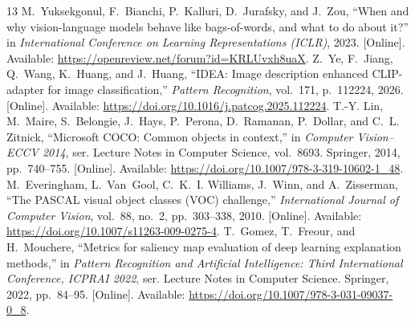 \begin{thebibliography}{13}
M.~Yuksekgonul, F.~Bianchi, P.~Kalluri, D.~Jurafsky, and J.~Zou, ``When and why
vision-language models behave like bags-of-words, and what to do about it?'' in
\emph{International Conference on Learning Representations (ICLR)}, 2023.
[Online]. Available: \url{https://openreview.net/forum?id=KRLUvxh8uaX}.
Z.~Ye, F.~Jiang, Q.~Wang, K.~Huang, and J.~Huang, ``{IDEA}: Image description
enhanced {CLIP}-adapter for image classification,'' \emph{Pattern Recognition},
vol.~171, p.~112224, 2026. [Online]. Available:
\url{https://doi.org/10.1016/j.patcog.2025.112224}.
T.-Y. Lin, M.~Maire, S.~Belongie, J.~Hays, P.~Perona, D.~Ramanan, P.~Dollar,
and C.~L. Zitnick, ``Microsoft {COCO}: Common objects in context,'' in
\emph{Computer Vision--ECCV 2014}, ser. Lecture Notes in Computer Science,
vol.~8693. Springer, 2014, pp.~740--755. [Online]. Available:
\url{https://doi.org/10.1007/978-3-319-10602-1_48}.
M.~Everingham, L.~Van~Gool, C.~K.~I. Williams, J.~Winn, and A.~Zisserman,
``The {PASCAL} visual object classes ({VOC}) challenge,'' \emph{International
Journal of Computer Vision}, vol.~88, no.~2, pp.~303--338, 2010. [Online]. Available:
\url{https://doi.org/10.1007/s11263-009-0275-4}.
T.~Gomez, T.~Freour, and H.~Mouchere, ``Metrics for saliency map evaluation of
deep learning explanation methods,'' in \emph{Pattern Recognition and
Artificial Intelligence: Third International Conference, ICPRAI 2022}, ser.
Lecture Notes in Computer Science. Springer, 2022, pp.~84--95. [Online]. Available:
\url{https://doi.org/10.1007/978-3-031-09037-0_8}.
\end{thebibliography}
